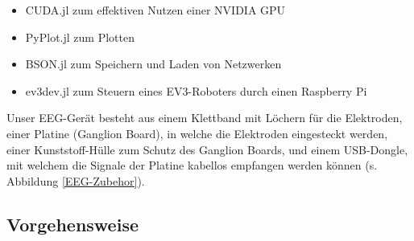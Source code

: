 \documentclass[11pt]{scrartcl}
\begin{document}
\begin{itemize}
\begin{itemize}
			\item CUDA.jl zum effektiven Nutzen einer NVIDIA GPU
				\cite{CUDA}
			
			\item PyPlot.jl zum Plotten
				\cite{pyplot}
			
			\item BSON.jl zum Speichern und Laden von Netzwerken
			
			\item ev3dev.jl zum Steuern eines EV3-Roboters durch einen Raspberry Pi
				\cite{ev3dev}
			
		\end{itemize}

	\end{itemize}

	\begin{figure}[h!]
	\end{figure}

	Unser EEG-Gerät besteht aus einem Klettband mit Löchern für die Elektroden, einer Platine (Ganglion Board), in welche die Elektroden eingesteckt werden, einer Kunststoff-Hülle zum Schutz des Ganglion Boards, und einem USB-Dongle, mit welchem die Signale der Platine kabellos empfangen werden können (s. Abbildung \ref{EEG-Zubehor}).

	\subsection{Vorgehensweise}
\end{document}
